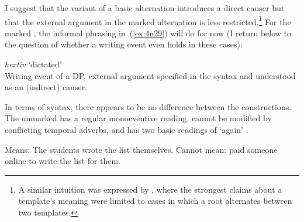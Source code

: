 \begin{exe}
\begin{xlist}
\begin{xlist}
\begin{exe}
\begin{exe}
\begin{xlist}
\begin{exe}
\begin{xlist}
\begin{exe}
\begin{xlist}
\begin{xlist}
\begin{exe}
\begin{xlist}
\begin{exe}
\begin{xlist}
\begin{exe}
\begin{exe}
\begin{exe}
\begin{xlist}
\begin{exe}
\begin{exe}
\begin{xlist}
\begin{xlist}
\begin{exe}
\begin{xlist}
\begin{exe}
\begin{exe}
\begin{exe}
\begin{xlist}
\begin{exe}
\begin{exe}
\begin{xlist}
\begin{exe}
\begin{xlist}
\begin{exe}
\begin{xlist}
\begin{exe}
\begin{xlist}
\begin{exe}
\begin{exe}
\begin{xlist}
I suggest that the  variant of a basic alternation introduces a direct causer \citep{bittner99,kratzer05} but that the external argument in the marked alternation is less restricted.\footnote{A similar intuition was expressed by \cite{doron03}, where the strongest claims about a template's meaning were limited to cases in which a root alternates between two templates.} For the marked , the informal phrasing in~(\ref{ex:4n29}) will do for now (I return below to the question of whether a writing event even holds in these cases):
 \begin{exe}
\ex  \label{ex:4n29}\emph{hextiv} `dictated' \\
	Writing event of a DP, external argument specified in the syntax and understood as an (indirect) causer.
 \z 

In terms of syntax, there appears to be no difference between the constructions. The unmarked  has a regular monoeventive reading, cannot be modified by conflicting temporal adverbs, and has two basic readings of `again' \citep{vonstechow96}.

 \begin{exe}

		\begin{xlist}
	 	\ex  Means: The students wrote the list themselves. 
 		\ex  Cannot mean: paid someone online to write the list for them. 
 		\z

		

\end{xlist}
\end{exe}
\end{exe}
\end{xlist}
\end{exe}
\end{exe}
\end{xlist}
\end{exe}
\end{xlist}
\end{exe}
\end{xlist}
\end{exe}
\end{xlist}
\end{exe}
\end{exe}
\end{xlist}
\end{exe}
\end{exe}
\end{exe}
\end{xlist}
\end{exe}
\end{xlist}
\end{xlist}
\end{exe}
\end{exe}
\end{xlist}
\end{exe}
\end{exe}
\end{exe}
\end{xlist}
\end{exe}
\end{xlist}
\end{exe}
\end{xlist}
\end{xlist}
\end{exe}
\end{xlist}
\end{exe}
\end{xlist}
\end{exe}
\end{exe}
\end{xlist}
\end{xlist}
\end{exe}
